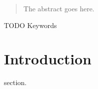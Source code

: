 \documentclass[journal]{IEEEtran}
\begin{document}







\maketitle

\begin{abstract}
The abstract goes here.
\end{abstract}

\begin{IEEEkeywords}
TODO Keywords
\end{IEEEkeywords}






%
\IEEEpeerreviewmaketitle



\section{Introduction}
% 
% 
% 
% 
 section.
\end{document}
